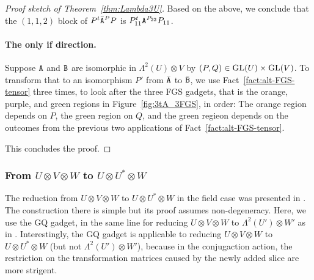 \begin{proof}[Proof sketch of Theorem~\ref{thm:Lambda3U}]
%
Based on the above, we conclude that the $(1, 1, 2)$ block of $P^t\bar{\mathtt{A}}^P P$ is $P_{11}^t\mathtt{A}^{P_{22}}P_{11}$. 

\paragraph{The only if direction.} Suppose $\mathtt{A}$ and $\mathtt{B}$ are isomorphic in $\Lambda^2(U)\otimes V$ by $(P, Q)\in \mathrm{GL}(U)\times\mathrm{GL}(V)$. To transform that to an isomorphism $P'$ from $\bar{\mathtt{A}}$ to $\bar{\mathtt{B}}$, we use Fact~\ref{fact:alt-FGS-tensor} three times, to look after the three FGS gadgets, that is the orange, purple, and green regions in Figure~\ref{fig:3tA_3FGS}, in order: The orange region depends on $P$, the green region on $Q$, and the green regieon depends on the outcomes from the previous two applications of Fact~\ref{fact:alt-FGS-tensor}. 

This concludes the proof.
\end{proof}

\subsubsection{From $U\otimes V\otimes W$ to $U\otimes U^*\otimes W$}\label{subsec:UUstarW}

The reduction from $U\otimes V\otimes W$ to $U\otimes U^*\otimes W$ in the field case was presented in \cite{TI1}. The construction there is simple but its proof assumes non-degeneracy. Here, we use the GQ gadget, in the same line for reducing $U\otimes V\otimes W$ to $\Lambda^2(U')\otimes W'$ as in \cite{TI4}. Interestingly, the GQ gadget is applicable to reducing $U\otimes V\otimes W$ to $U\otimes U^*\otimes W$ (but not $\Lambda^2(U')\otimes W'$), because in the conjugaction action, the restriction on the transformation matrices caused by the newly added slice are more strigent.

